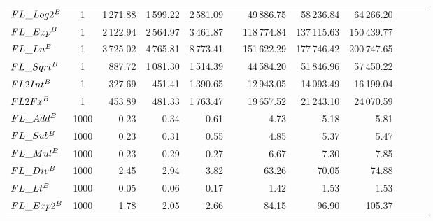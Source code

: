 \begin{table}
{\begin{tabular}{ l c r r r r r r r r r r}
            $FL\_Log2^{B}$                         & 1       & 1\,271.88               & 1\,599.22 & 2\,581.09               &  & 49\,886.75  & 58\,236.84  & 64\,266.20  \\
            $FL\_Exp^{B}$                          & 1       & 2\,122.94               & 2\,564.97 & 3\,461.87               &  & 118\,774.84 & 137\,115.63 & 150\,439.77 \\
            $FL\_Ln^{B}$                           & 1       & 3\,725.02               & 4\,765.81 & 8\,773.41               &  & 151\,622.29 & 177\,746.42 & 200\,747.65 \\
            $FL\_Sqrt^{B}$                         & 1       & 887.72                  & 1\,081.30 & 1\,514.39               &  & 44\,584.20  & 51\,846.96  & 57\,450.22  \\
            $FL2Int^{B}$                           & 1       & 327.69                  & 451.41    & 1\,390.65               &  & 12\,943.05  & 14\,093.49  & 16\,199.04  \\
            $FL2Fx^{B}$                            & 1       & 453.89                  & 481.33    & 1\,763.47               &  & 19\,657.52  & 21\,243.10  & 24\,070.59  \\
            \midrule
            $FL\_Add^{B}$                          & 1000    & 0.23                    & 0.34      & 0.61                    &  & 4.73        & 5.18        & 5.81        \\
            $FL\_Sub^{B}$                          & 1000    & 0.23                    & 0.31      & 0.55                    &  & 4.85        & 5.37        & 5.47        \\
            $FL\_Mul^{B}$                          & 1000    & 0.23                    & 0.29      & 0.27                    &  & 6.67        & 7.30        & 7.85        \\
            $FL\_Div^{B}$                          & 1000    & 2.45                    & 2.94      & 3.82                    &  & 63.26       & 70.05       & 74.88       \\
            $FL\_Lt^{B}$                           & 1000    & 0.05                    & 0.06      & 0.17                    &  & 1.42        & 1.53        & 1.53        \\
            $FL\_Exp2^{B}$                         & 1000    & 1.78                    & 2.05      & 2.66                    &  & 84.15       & 96.90       & 105.37      \\

\end{tabular}}
\end{table}

